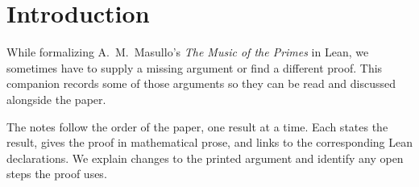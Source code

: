 \section*{Introduction}

While formalizing A.\ M.\ Masullo's \emph{The Music of the Primes} in Lean,
we sometimes have to supply a missing argument or find a different proof.
This companion records some of those arguments so they can be read and
discussed alongside the paper.

The notes follow the order of the paper, one result at a time. Each states
the result, gives the proof in mathematical prose, and links to the
corresponding Lean declarations. We explain changes to the printed
argument and identify any open steps the proof uses.
